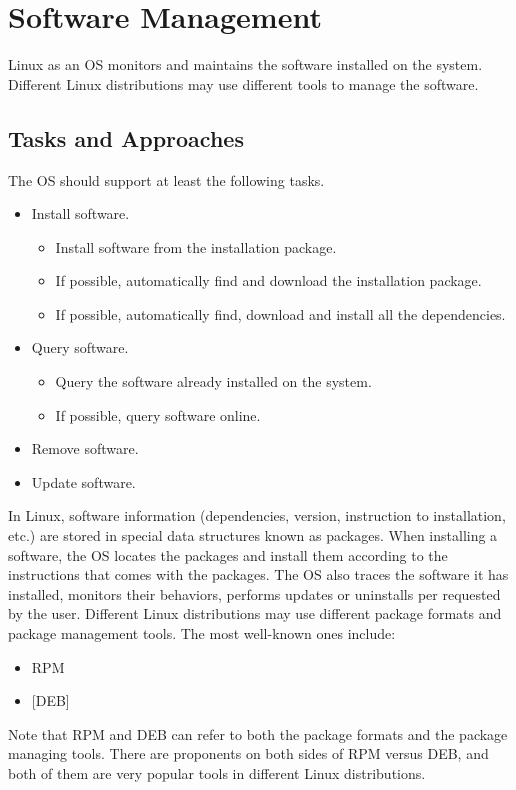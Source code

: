 \chapter{Software Management}

Linux as an OS monitors and maintains the software installed on the system. Different Linux distributions may use different tools to manage the software.

\section{Tasks and Approaches}

The OS should support at least the following tasks.
\begin{itemize}
	\item Install software.
		\begin{itemize}
			\item Install software from the installation package.
			\item If possible, automatically find and download the installation package.
			\item If possible, automatically find, download and install all the dependencies.
		\end{itemize}
	\item Query software.
		\begin{itemize}
			\item Query the software already installed on the system.
			\item If possible, query software online.
		\end{itemize}
	\item Remove software.
	\item Update software.
\end{itemize}

In Linux, software information (dependencies, version, instruction to installation, etc.) are stored in special data structures known as packages. When installing a software, the OS locates the packages and install them according to the instructions that comes with the packages. The OS also traces the software it has installed, monitors their behaviors, performs updates or uninstalls per requested by the user. Different Linux distributions may use different package formats and package management tools. The most well-known ones include:
\begin{itemize}
	\item RPM
	\item {}[DEB]
\end{itemize}
Note that RPM and DEB can refer to both the package formats and the package managing tools. There are proponents on both sides of RPM versus DEB, and both of them are very popular tools in different Linux distributions.

